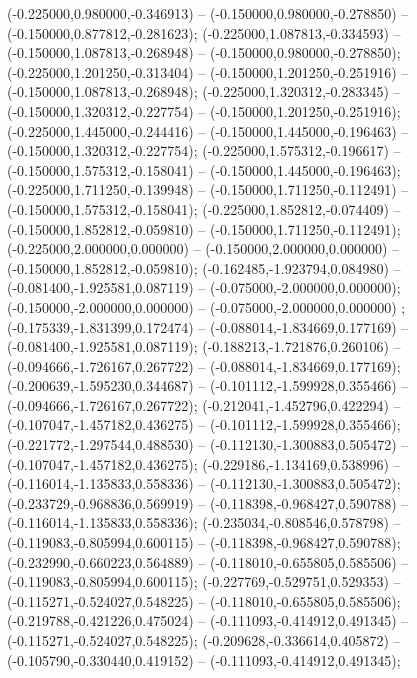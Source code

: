  (-0.225000,0.980000,-0.346913) -- (-0.150000,0.980000,-0.278850) -- (-0.150000,0.877812,-0.281623);
 (-0.225000,1.087813,-0.334593) -- (-0.150000,1.087813,-0.268948) -- (-0.150000,0.980000,-0.278850);
 (-0.225000,1.201250,-0.313404) -- (-0.150000,1.201250,-0.251916) -- (-0.150000,1.087813,-0.268948);
 (-0.225000,1.320312,-0.283345) -- (-0.150000,1.320312,-0.227754) -- (-0.150000,1.201250,-0.251916);
 (-0.225000,1.445000,-0.244416) -- (-0.150000,1.445000,-0.196463) -- (-0.150000,1.320312,-0.227754);
 (-0.225000,1.575312,-0.196617) -- (-0.150000,1.575312,-0.158041) -- (-0.150000,1.445000,-0.196463);
 (-0.225000,1.711250,-0.139948) -- (-0.150000,1.711250,-0.112491) -- (-0.150000,1.575312,-0.158041);
 (-0.225000,1.852812,-0.074409) -- (-0.150000,1.852812,-0.059810) -- (-0.150000,1.711250,-0.112491);
 (-0.225000,2.000000,0.000000) -- (-0.150000,2.000000,0.000000) -- (-0.150000,1.852812,-0.059810);
 (-0.162485,-1.923794,0.084980) -- (-0.081400,-1.925581,0.087119) -- (-0.075000,-2.000000,0.000000);
 (-0.150000,-2.000000,0.000000) -- (-0.075000,-2.000000,0.000000) ;
 (-0.175339,-1.831399,0.172474) -- (-0.088014,-1.834669,0.177169) -- (-0.081400,-1.925581,0.087119);
 (-0.188213,-1.721876,0.260106) -- (-0.094666,-1.726167,0.267722) -- (-0.088014,-1.834669,0.177169);
 (-0.200639,-1.595230,0.344687) -- (-0.101112,-1.599928,0.355466) -- (-0.094666,-1.726167,0.267722);
 (-0.212041,-1.452796,0.422294) -- (-0.107047,-1.457182,0.436275) -- (-0.101112,-1.599928,0.355466);
 (-0.221772,-1.297544,0.488530) -- (-0.112130,-1.300883,0.505472) -- (-0.107047,-1.457182,0.436275);
 (-0.229186,-1.134169,0.538996) -- (-0.116014,-1.135833,0.558336) -- (-0.112130,-1.300883,0.505472);
 (-0.233729,-0.968836,0.569919) -- (-0.118398,-0.968427,0.590788) -- (-0.116014,-1.135833,0.558336);
 (-0.235034,-0.808546,0.578798) -- (-0.119083,-0.805994,0.600115) -- (-0.118398,-0.968427,0.590788);
 (-0.232990,-0.660223,0.564889) -- (-0.118010,-0.655805,0.585506) -- (-0.119083,-0.805994,0.600115);
 (-0.227769,-0.529751,0.529353) -- (-0.115271,-0.524027,0.548225) -- (-0.118010,-0.655805,0.585506);
 (-0.219788,-0.421226,0.475024) -- (-0.111093,-0.414912,0.491345) -- (-0.115271,-0.524027,0.548225);
 (-0.209628,-0.336614,0.405872) -- (-0.105790,-0.330440,0.419152) -- (-0.111093,-0.414912,0.491345);
